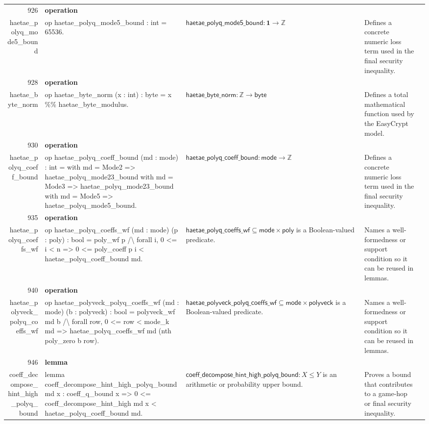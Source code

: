 \documentclass[10pt]{article}
\newcommand{\ec}[1]{\begingroup\ttfamily\scriptsize #1\endgroup}
\begin{document}
\begin{longtable}{r L{0.17\textwidth} L{0.26\textwidth} L{0.27\textwidth} L{0.20\textwidth}}
926 & \textbf{operation}\\\ec{haetae\_polyq\_mode5\_bound} & \ec{op haetae\_polyq\_mode5\_bound : int = 65536.} & \(\mathsf{haetae\_polyq\_mode5\_bound} : \mathbf{1} \to \mathbb{Z}\) & Defines a concrete numeric loss term used in the final security inequality. \\
928 & \textbf{operation}\\\ec{haetae\_byte\_norm} & \ec{op haetae\_byte\_norm (x : int) : byte = x \%\% haetae\_byte\_modulus.} & \(\mathsf{haetae\_byte\_norm} : \mathbb{Z} \to \mathsf{byte}\) & Defines a total mathematical function used by the EasyCrypt model. \\
930 & \textbf{operation}\\\ec{haetae\_polyq\_coeff\_bound} & \ec{op haetae\_polyq\_coeff\_bound (md : mode) : int = with md = Mode2 => haetae\_polyq\_mode23\_bound with md = Mode3 => haetae\_polyq\_mode23\_bound with md = Mode5 => haetae\_polyq\_mode5\_bound.} & \(\mathsf{haetae\_polyq\_coeff\_bound} : \mathsf{mode} \to \mathbb{Z}\) & Defines a concrete numeric loss term used in the final security inequality. \\
935 & \textbf{operation}\\\ec{haetae\_polyq\_coeffs\_wf} & \ec{op haetae\_polyq\_coeffs\_wf (md : mode) (p : poly) : bool = poly\_wf p /\textbackslash{} forall i, 0 <= i < n => 0 <= poly\_coeff p i < haetae\_polyq\_coeff\_bound md.} & \(\mathsf{haetae\_polyq\_coeffs\_wf} \subseteq \mathsf{mode} \times \mathsf{poly}\) is a Boolean-valued predicate. & Names a well-formedness or support condition so it can be reused in lemmas. \\
940 & \textbf{operation}\\\ec{haetae\_polyveck\_polyq\_coeffs\_wf} & \ec{op haetae\_polyveck\_polyq\_coeffs\_wf (md : mode) (b : polyveck) : bool = polyveck\_wf md b /\textbackslash{} forall row, 0 <= row < mode\_k md => haetae\_polyq\_coeffs\_wf md (nth poly\_zero b row).} & \(\mathsf{haetae\_polyveck\_polyq\_coeffs\_wf} \subseteq \mathsf{mode} \times \mathsf{polyveck}\) is a Boolean-valued predicate. & Names a well-formedness or support condition so it can be reused in lemmas. \\
946 & \textbf{lemma}\\\ec{coeff\_decompose\_hint\_high\_polyq\_bound} & \ec{lemma coeff\_decompose\_hint\_high\_polyq\_bound md x : coeff\_q\_bound x => 0 <= coeff\_decompose\_hint\_high md x < haetae\_polyq\_coeff\_bound md.} & \(\mathsf{coeff\_decompose\_hint\_high\_polyq\_bound} : X \le Y\) is an arithmetic or probability upper bound. & Proves a bound that contributes to a game-hop or final security inequality. \\

\end{longtable}
\end{document}

